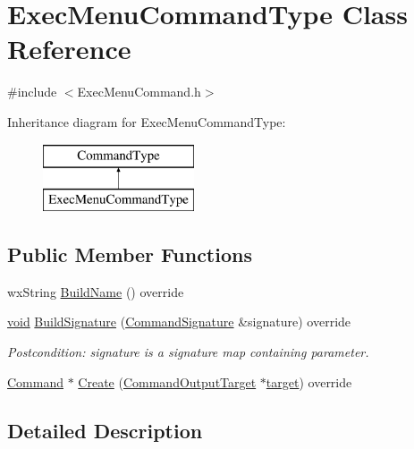\hypertarget{class_exec_menu_command_type}{}\section{Exec\+Menu\+Command\+Type Class Reference}
\label{class_exec_menu_command_type}


{\ttfamily \#include $<$Exec\+Menu\+Command.\+h$>$}

Inheritance diagram for Exec\+Menu\+Command\+Type\+:\begin{figure}[H]
\begin{center}
\leavevmode
\includegraphics[height=2.000000cm]{class_exec_menu_command_type}
\end{center}
\end{figure}
\subsection*{Public Member Functions}
\begin{DoxyCompactItemize}
\item 
wx\+String \hyperlink{class_exec_menu_command_type_a2fd890a89c18eaa1c61bcfe178aeaaad}{Build\+Name} () override
\item 
\hyperlink{sound_8c_ae35f5844602719cf66324f4de2a658b3}{void} \hyperlink{class_exec_menu_command_type_a9862fbbd9a12b52bb157c1c857fd9e7e}{Build\+Signature} (\hyperlink{class_command_signature}{Command\+Signature} \&signature) override
\begin{DoxyCompactList}\small\item\em Postcondition\+: signature is a \textquotesingle{}signature\textquotesingle{} map containing parameter. \end{DoxyCompactList}\item 
\hyperlink{class_command}{Command} $\ast$ \hyperlink{class_exec_menu_command_type_a66cbe7d30ac0d999069e0728861fad8f}{Create} (\hyperlink{class_command_output_target}{Command\+Output\+Target} $\ast$\hyperlink{lib_2expat_8h_a15a257516a87decb971420e718853137}{target}) override
\end{DoxyCompactItemize}


\subsection{Detailed Description}


